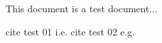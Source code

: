 \documentclass{article}
\begin{document}
This document is a test document...

cite test 01 i.e.
cite test 02 e.g.
\end{document}
